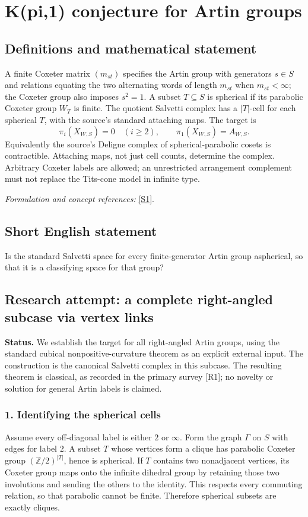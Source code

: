 \documentclass[11pt]{article}
\begin{document}
\section*{\texorpdfstring{K(pi,1) conjecture for Artin groups}{K(pi,1) conjecture for Artin groups}}\label{30006805}
\subsection{Definitions and mathematical statement}
A finite Coxeter matrix $(m_{st})$ specifies the Artin group with generators $s\in S$ and relations equating the two alternating words of length $m_{st}$ when $m_{st}<\infty$; the Coxeter group also imposes $s^2=1$. A subset $T\subseteq S$ is spherical if its parabolic Coxeter group $W_T$ is finite. The quotient Salvetti complex has a $|T|$-cell for each spherical $T$, with the source's standard attaching maps. The target is
\[
 \pi_i(X_{W,S})=0\quad(i\ge2),\qquad\pi_1(X_{W,S})=A_{W,S}.
\]
Equivalently the source's Deligne complex of spherical-parabolic cosets is contractible. Attaching maps, not just cell counts, determine the complex. Arbitrary Coxeter labels are allowed; an unrestricted arrangement complement must not replace the Tits-cone model in infinite type.
\par\smallskip\textit{Formulation and concept references:} \href{https://arxiv.org/html/2607.24659v1}{[S1]}.

\subsection{Short English statement}
Is the standard Salvetti space for every finite-generator Artin group aspherical, so that it is a classifying space for that group?
\subsection{Research attempt: a complete right-angled subcase via vertex links}
\textbf{Status.} We establish the target for all right-angled Artin groups, using the standard cubical nonpositive-curvature theorem as an explicit external input. The construction is the canonical Salvetti complex in this subcase. The resulting theorem is classical, as recorded in the primary survey [R1]; no novelty or solution for general Artin labels is claimed.

\subsubsection{1. Identifying the spherical cells}
Assume every off-diagonal label is either $2$ or $\infty$. Form the graph $\Gamma$ on $S$ with edges for label $2$. A subset $T$ whose vertices form a clique has parabolic Coxeter group $(\mathbb Z/2)^{|T|}$, hence is spherical. If $T$ contains two nonadjacent vertices, its Coxeter group maps onto the infinite dihedral group by retaining those two involutions and sending the others to the identity. This respects every commuting relation, so that parabolic cannot be finite. Therefore spherical subsets are exactly cliques.
\end{document}
